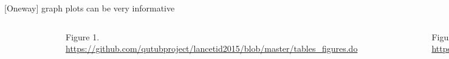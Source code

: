 \documentclass[aspectratio=169]{beamer}
\begin{document}
\begin{frame}[fragile]{[Oneway] graph plots can be very informative}
	\begin{columns}[c]
		\begin{figure}
			\centering
			\includegraphics[width=\linewidth]{img/oneway1}
		\end{figure}
		Figure 1. \url{https://github.com/qutubproject/lancetid2015/blob/master/tables_figures.do}
		\begin{figure}
			\centering
			\includegraphics[width=\linewidth]{img/oneway2}
		\end{figure}
		Figure 2. \url{https://github.com/qutubproject/lancetid2016/blob/master/tables_figures.do}
	\end{columns}
\end{frame}
\end{document}
